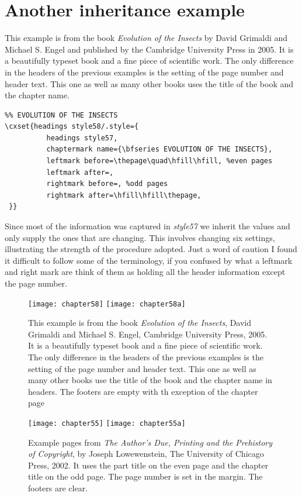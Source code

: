 \section{Another inheritance example}

This example is from the book \textit{Evolution of the Insects} by David Grimaldi and Michael S. Engel and published by the Cambridge University Press in 2005. It is a beautifully typeset book and a fine piece of scientific work. The only difference in the headers of the previous examples is the setting of the page number and header text. This one as well as many other books uses the title of the book and the chapter name.

\begin{tcolorbox}
\begin{lstlisting}
%% EVOLUTION OF THE INSECTS
\cxset{headings style58/.style={
          headings style57,
          chaptermark name={\bfseries EVOLUTION OF THE INSECTS},
          leftmark before=\thepage\quad\hfill\hfill, %even pages
          leftmark after=,
          rightmark before=, %odd pages
          rightmark after=\hfill\hfill\thepage,
 }}
\end{lstlisting}
\end{tcolorbox}

Since most of the information was captured in \textit{style57} we inherit the values and only supply the ones  that are changing. This involves changing six settings, illustrating the strength of the procedure adopted. Just a word of caution I found it difficult to follow some of the terminology, if you confused by what a leftmark and right mark are think of them as holding all the header information except the page number.



\begin{figure}
\centering
\texttt{[image: chapter58]}\vspace{0.5\baselineskip}
\texttt{[image: chapter58a]}
\caption{This example is from the book \textit{Evolution of the Insects}, David Grimaldi and Michael S. Engel,  Cambridge University Press, 2005. It is a beautifully typeset book and a fine piece of scientific work. The only difference in the headers of the previous examples is the setting of the page number and header text. This one as well as many other books use the title of the book and the chapter name in headers. The footers are empty with th exception of the chapter page}
\end{figure}


\begin{figure}
\centering
\texttt{[image: chapter55]}\vspace{0.5\baselineskip}
\texttt{[image: chapter55a]}
\caption{Example pages from \textit{The Author's Due, Printing and the Prehistory of Copyright}, by Joseph Lowewenstein, The University of Chicago Press, 2002.  It uses the part title on the even page and the chapter title on the odd page. The page number is set in the margin. The footers are clear.}
\end{figure}


